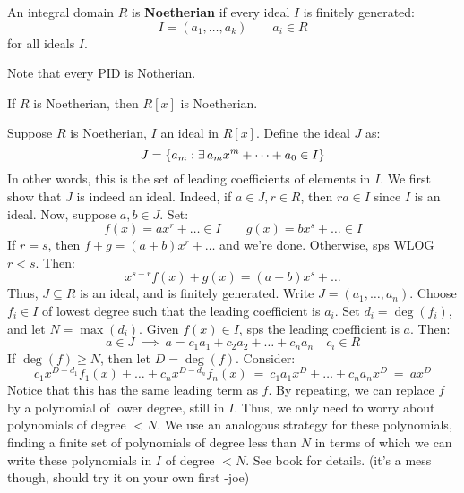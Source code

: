 \begin{defn}
    An integral domain $ R $ is \textbf{Noetherian} if every ideal $ I $ is finitely generated:
    \begin{equation*}
        I = (a_{1},\dots,a_{k}) \qquad a_{i} \in R
    \end{equation*}
    for all ideals $ I $.
\end{defn}
Note that every PID is Notherian.

\begin{lm}[title=Hilbert's Lemma]
    If $ R $ is Noetherian, then $ R[x] $ is Noetherian.
\end{lm}

\begin{pf}[source=Primary Source Material]
    Suppose $ R $ is Noetherian, $ I $ an ideal in $ R[x] $. Define the ideal $ J $ as:
    \begin{equation*}
        J = \left\{{a_{m} : \exists \, a_{m}x^{m}+\dots+a_{0} \in I}\right\}
    \end{equation*}
    In other words, this is the set of leading coefficients of elements in $ I $. \vsp
    We first show that $ J $ is indeed an ideal.
    Indeed, if $ a \in J, r \in R $, then $ ra \in I $ since $ I $ is an ideal.
    Now, suppose $ a, b \in J $. Set:
    \begin{equation*}
        f(x) = ax^{r} + \dots \in I \qquad g(x) = bx^{s} + \dots \in I
    \end{equation*}
    If $ r = s $, then $ f+g = (a+b)x^{r}+\dots $ and we're done. Otherwise, sps WLOG $ r<s $.
    Then:
    \begin{equation*}
        x^{s-r}f(x)+g(x) = (a+b)x^{s}+\dots
    \end{equation*}
    Thus, $ J \subseteq R $ is an ideal, and is finitely generated. \vsp
    Write $ J = (a_{1},\dots,a_{n}) $. Choose $ f_{i} \in I $ of lowest degree such that the
    leading coefficient is $ a_{i} $. Set $ d_{i} = \deg(f_{i}) $, and let $ N = \max(d_{i}) $. \vsp
    Given $ f(x) \in I $, sps the leading coefficient is $ a $. Then:
    \begin{equation*}
        a \in J \ \implies \ a = c_{1}a_{1} + c_{2}a_{2}+\dots+c_{n}a_{n} \quad c_{i} \in R
    \end{equation*}
    If $ \deg(f) \geq N $, then let $ D = \deg(f) $. Consider:
    \begin{equation*}
        c_{1}x^{D-d_{1}}f_{1}(x) + \dots + c_{n}x^{D-d_{n}}f_{n}(x)
        \ = \ c_{1}a_{1}x^{D} + \dots + c_{n}a_{n}x^{D} \ = \ ax^{D}
    \end{equation*}
    Notice that this has the same leading term as $ f $. \vsp
    By repeating, we can replace $ f $ by a polynomial of lower degree, still in $ I $.
    Thus, we only need to worry about polynomials of degree $ < N $. \vsp
    We use an analogous strategy for these polynomials, finding a finite set of polynomials of
    degree less than $ N $ in terms of which we can write these polynomials in $ I $ of degree
    $ < N $. See book for details. (it's a mess though, should try it on your own first -joe)
\end{pf}
